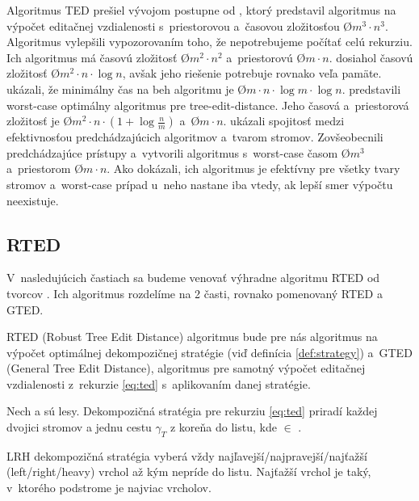 Algoritmus TED prešiel vývojom postupne od \citet{TAI}, ktorý predstavil algoritmus
na výpočet editačnej vzdialenosti s~priestorovou a~časovou zložitosťou
\O{$m^3 \cdot n^3$}. Algoritmus vylepšili \citet{ZHANGSHASHA} vypozorovaním toho,
že nepotrebujeme počítať celú rekurziu. Ich algoritmus má časovú zložitosť \O{$m^2 \cdot n^2$}
a~priestorovú \O{$m \cdot n$}. \citet{KLEIN} dosiahol časovú zložitosť \O{$m^2 \cdot n \cdot \log{n}$},
avšak jeho riešenie potrebuje rovnako veľa pamäte.
\citet{DALUCQ} ukázali, že minimálny čas na beh algoritmu je \O{$m \cdot n \cdot \log{m} \cdot \log{n}$}.
\citet{DMRW} predstavili worst-case optimálny algoritmus pre tree-edit-distance.
Jeho časová a~priestorová zložitosť je \O{$m^2 \cdot n \cdot (1 + \log{\frac{n}{m}})$}
a~\O{$m \cdot n$}. \citet{RTED} ukázali spojitosť medzi efektivnosťou predchádzajúcich algoritmov
a~tvarom stromov. Zovšeobecnili predchádzajúce prístupy a~vytvorili algoritmus
s~worst-case časom \O{$m^3$} a~priestorom \O{$m \cdot n$}.
Ako dokázali, ich algoritmus je efektívny pre všetky tvary stromov a~worst-case
prípad u~neho nastane iba vtedy, ak lepší smer výpočtu neexistuje.





\subsection{RTED}

V~nasledujúcich častiach sa budeme venovať výhradne algoritmu RTED od tvorcov \citet{RTED}.
Ich algoritmus rozdelíme na 2 časti, rovnako pomenovaný RTED a GTED.

RTED (Robust Tree Edit Distance) algoritmus bude pre nás algoritmus na výpočet
optimálnej dekompozičnej stratégie (viď definícia \ref{def:strategy})
a~GTED (General Tree Edit Distance), algoritmus pre samotný výpočet editačnej
vzdialenosti z~rekurzie \ref{eq:ted} s~aplikovaním danej stratégie.

\begin{definice}
  \label{def:strategy}
  Nech  a  sú lesy. Dekompozičná stratégia pre rekurziu \ref{eq:ted} priradí
  každej dvojici stromov  a  jednu cestu $\gamma_{T}$
  z koreňa do listu, kde  $\in$ .

	LRH dekompozičná stratégia vyberá vždy najľavejší/najpravejší/najťažší
	(left/right/heavy) vrchol až kým nepríde do listu. Najťažší vrchol je taký,
	v~ktorého podstrome je najviac vrcholov. 
\end{definice}

